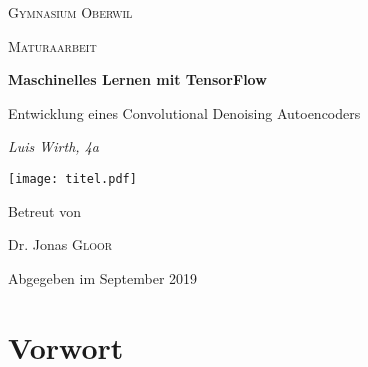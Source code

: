 
\begin{titlepage}
  \centering

  {\scshape\LARGE Gymnasium Oberwil\par}
  \vspace{1cm}
  {\scshape\Large Maturaarbeit\par}
  \vspace{1.5cm}
  {\huge\bfseries Maschinelles Lernen mit TensorFlow\par}
  \vspace{0.1cm}
  {\large Entwicklung eines Convolutional Denoising Autoencoders\par}
  \vspace{2cm}
  {\Large\itshape Luis Wirth, 4a\par}

  \vfill

  \texttt{[image: titel.pdf]}

  \vfill
  Betreut von\par
  Dr. Jonas \textsc{Gloor}

  \vfill
  {\large Abgegeben im September 2019\par}
\end{titlepage}


\tableofcontents
\pagebreak

\chapter*{Vorwort}
